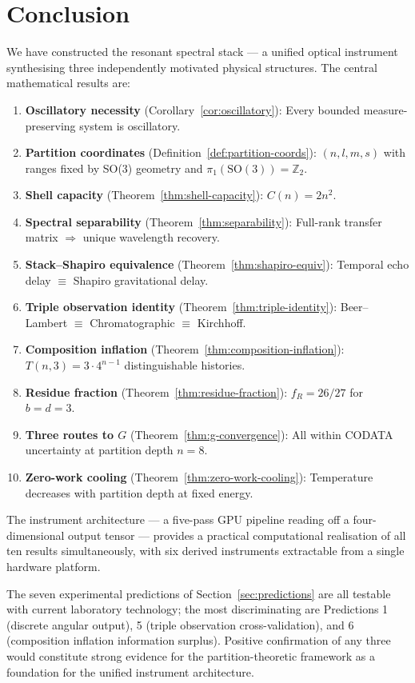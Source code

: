 \documentclass[11pt,twocolumn,a4paper]{article}
\theoremstyle{plain}
\theoremstyle{definition}
\theoremstyle{remark}
\newcommand{\Z}{\mathbb{Z}}
\begin{document}
\section{Conclusion}

We have constructed the resonant spectral stack — a unified optical instrument synthesising three independently motivated physical structures. The central mathematical results are:

\begin{enumerate}[noitemsep]
  \item \textbf{Oscillatory necessity} (Corollary~\ref{cor:oscillatory}): Every bounded measure-preserving system is oscillatory.
  \item \textbf{Partition coordinates} (Definition~\ref{def:partition-coords}): $(n,l,m,s)$ with ranges fixed by SO(3) geometry and $\pi_1(\mathrm{SO}(3))=\Z_2$.
  \item \textbf{Shell capacity} (Theorem~\ref{thm:shell-capacity}): $C(n)=2n^2$.
  \item \textbf{Spectral separability} (Theorem~\ref{thm:separability}): Full-rank transfer matrix $\Rightarrow$ unique wavelength recovery.
  \item \textbf{Stack--Shapiro equivalence} (Theorem~\ref{thm:shapiro-equiv}): Temporal echo delay $\equiv$ Shapiro gravitational delay.
  \item \textbf{Triple observation identity} (Theorem~\ref{thm:triple-identity}): Beer--Lambert $\equiv$ Chromatographic $\equiv$ Kirchhoff.
  \item \textbf{Composition inflation} (Theorem~\ref{thm:composition-inflation}): $T(n,3)=3\cdot 4^{n-1}$ distinguishable histories.
  \item \textbf{Residue fraction} (Theorem~\ref{thm:residue-fraction}): $f_R=26/27$ for $b=d=3$.
  \item \textbf{Three routes to $G$} (Theorem~\ref{thm:g-convergence}): All within CODATA uncertainty at partition depth $n=8$.
  \item \textbf{Zero-work cooling} (Theorem~\ref{thm:zero-work-cooling}): Temperature decreases with partition depth at fixed energy.
\end{enumerate}

The instrument architecture — a five-pass GPU pipeline reading off a four-dimensional output tensor — provides a practical computational realisation of all ten results simultaneously, with six derived instruments extractable from a single hardware platform.

The seven experimental predictions of Section~\ref{sec:predictions} are all testable with current laboratory technology; the most discriminating are Predictions 1 (discrete angular output), 5 (triple observation cross-validation), and 6 (composition inflation information surplus). Positive confirmation of any three would constitute strong evidence for the partition-theoretic framework as a foundation for the unified instrument architecture.



\end{document}
